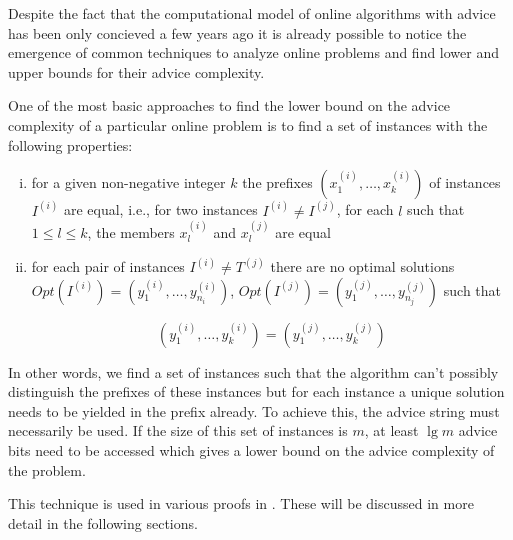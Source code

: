 Despite the fact that the computational model of online algorithms with
advice has been only concieved a few years ago it is already possible to
notice the emergence of common techniques to analyze online problems and
find lower and upper bounds for their advice complexity.

One of the most basic approaches to find the lower bound on the advice
complexity of a particular online problem is to find a set of instances
with the following properties:

\begin{enumerate}[(i)]
    \item
    for a given non-negative integer $k$ the prefixes $(x_1^{(i)}, \dots,
    x_k^{(i)})$ of instances $I^{(i)}$ are equal, i.e., for two instances
    $I^{(i)} \not= I^{(j)}$, for each $l$ such that $1 \leq l \leq k$,
    the members $x_l^{(i)}$ and $x_l^{(j)}$ are equal

    \item
    for each pair of instances $I^{(i)} \not= T^{(j)}$ there are no
    optimal solutions $Opt(I^{(i)}) = (y_1^{(i)}, \dots, y_{n_i}^{(i)})$,
    $Opt(I^{(j)}) = (y_1^{(j)}, \dots, y_{n_j}^{(j)})$ such that

    $$(y_1^{(i)}, \dots, y_{k}^{(i)}) = (y_1^{(j)}, \dots, y_{k}^{(j)})$$
\end{enumerate}

In other words, we find a set of instances such that the algorithm can't
possibly distinguish the prefixes of these instances but for each instance
a unique solution needs to be yielded in the prefix already. To achieve
this, the advice string must necessarily be used. If the size of this set
of instances is $m$, at least $\lg m$ advice bits need to be accessed
which gives a lower bound on the advice complexity of the problem.

This technique is used in various proofs in \cite{misof-trivial-graphs}.
These will be discussed in more detail in the following sections.
